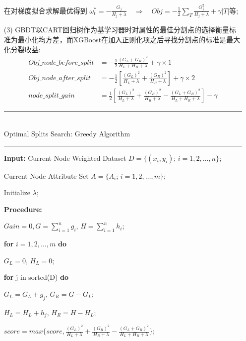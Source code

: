 \documentclass[a4paper]{article}
\begin{document}
\begin{itemize}
				在对梯度拟合求解最优得到 $\omega_t^{*} = -\frac{G_j}{H_j + \lambda}\quad\Rightarrow\quad 
				Obj = -\frac{1}{2}\sum_{T}\frac{G_j^2}{H_j+\lambda}+\gamma |T|$等;
			\item[(3)] GBDT以CART回归树作为基学习器时对属性的最佳分割点的选择衡量标准为最小化均方差，而XGBoost在加入正则化项之后寻找分割点的标准是最大化分裂收益:
			\begin{align*}
				Obj\_node\_before\_split & = -\frac{1}{2}\frac{(G_L+G_R)^2}{H_L+H_R+\lambda}+\gamma \times 1\\
				Obj\_node\_after\_split & = -\frac{1}{2}[\frac{(G_L)^2}{H_L+\lambda}+\frac{(G_R)^2}{H_R+\lambda}]+\gamma \times 2\\
				node\_split\_gain & = \frac{1}{2}[\frac{(G_L)^2}{H_L+\lambda}+\frac{(G_R)^2}{H_R+\lambda}- \frac{(G_L+G_R)^2}{H_L+H_R+\lambda}]-\gamma
			\end{align*}
			\noindent\rule[0.10\baselineskip]{\textwidth}{0.75pt}\\
			Optimal Splits Search: Greedy Algorithm\\
			\noindent\rule[0.10\baselineskip]{\textwidth}{0.5pt}
					\textbf{Input:} Current Node Weighted Dataset $D=\{(x_i,y_i);\, i = 1,2,\dots, n\};$\par
					\hspace*{32pt} Current Node Attribute Set $A = \{A_i;\,i=1,2,\dots,m\}$;\par
					\hspace*{32pt} Initialize $\lambda$;\par
					\textbf{Procedure:}\par
					\hspace*{32pt} $Gain = 0, G = \sum_{i=1}^{n}g_i,\,H = \sum_{i=1}^{n}h_i$;\par
					\hspace*{32pt} \textbf{for} $i = 1,2,\dots, m$ \textbf{do}\par
					\hspace*{48pt}	$G_L = 0, \, H_L = 0$;\par
					\hspace*{48pt}	\textbf{for} j in sorted(D) \textbf{do}\par
					\hspace*{64pt}	$G_L = G_L+g_j,\, G_R = G - G_L$;\par
					\hspace*{64pt}  $H_L = H_L+h_j,\, H_R = H - H_L$;\par
					\hspace*{48pt}  $score = max\{score, \frac{(G_L)^2}{H_L+\lambda}+\frac{(G_R)^2}{H_R+\lambda}- \frac{(G_L+G_R)^2}{H_L+H_R+\lambda}\};$\par

\end{itemize}
\end{document}
